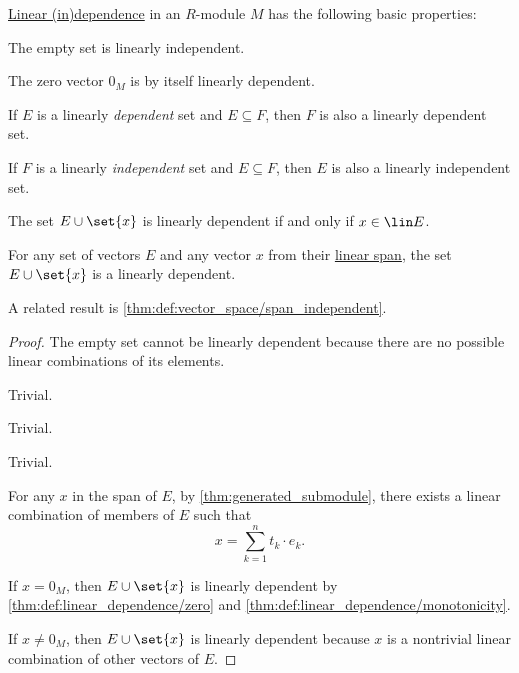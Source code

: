 \begin{proposition}\label{thm:def:linear_dependence}
  \hyperref[def:linear_dependence]{Linear (in)dependence} in an \( R \)-module \( M \) has the following basic properties:
  \begin{thmenum}
     The empty set is linearly independent.

     The zero vector \( 0_M \) is by itself linearly dependent.

     If \( E \) is a linearly \emph{dependent} set and \( E \subseteq F \), then \( F \) is also a linearly dependent set.

     If \( F \) is a linearly \emph{independent} set and \( E \subseteq F \), then \( E \) is also a linearly independent set.

     The set \( E \cup \set{ x } \) is linearly dependent if and only if \( x \in \lin E \).

     For any set of vectors \( E \) and any vector \( x \) from their \hyperref[def:linear_span]{linear span}, the set \( E \cup \set{ x } \) is a linearly dependent.

    A related result is \cref{thm:def:vector_space/span_independent}.
  \end{thmenum}
\end{proposition}
\begin{proof}
   The empty set cannot be linearly dependent because there are no possible linear combinations of its elements.

   Trivial.

   Trivial.

   Trivial.

   For any \( x \) in the span of \( E \), by \cref{thm:generated_submodule}, there exists a linear combination of members of \( E \) such that
  \begin{equation*}
    x = \sum_{k=1}^n t_k \cdot e_k.
  \end{equation*}

  If \( x = 0_M \), then \( E \cup \set{ x } \) is linearly dependent by \cref{thm:def:linear_dependence/zero} and \cref{thm:def:linear_dependence/monotonicity}.

  If \( x \neq 0_M \), then \( E \cup \set{ x } \) is linearly dependent because \( x \) is a nontrivial linear combination of other vectors of \( E \).
\end{proof}

